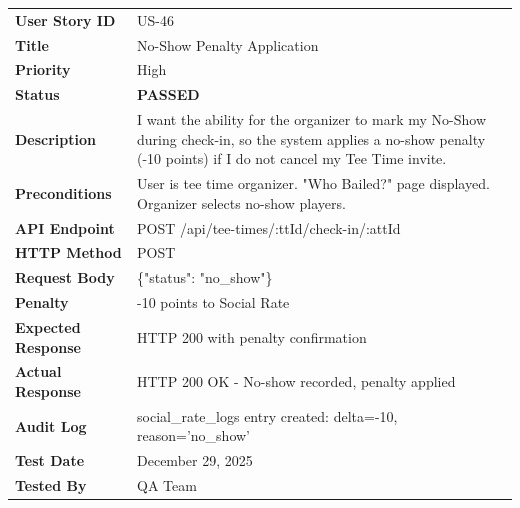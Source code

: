 \documentclass[11pt,a4paper]{article}
\newcommand{\passed}{\textcolor{pass}{\textbf{PASSED}}}
\begin{document}
\begin{tabularx}{\textwidth}{|p{3.2cm}|Y|}
\hline
{}
 \\
\hline
\textbf{User Story ID} & US-46 \\
\hline
\textbf{Title} & No-Show Penalty Application \\
\hline
\textbf{Priority} & High \\
\hline
\textbf{Status} & \passed \\
\hline
\textbf{Description} & I want the ability for the organizer to mark my No-Show during check-in, so the system applies a no-show penalty (-10 points) if I do not cancel my Tee Time invite. \\
\hline
\textbf{Preconditions} & User is tee time organizer. "Who Bailed?" page displayed. Organizer selects no-show players. \\
\hline
\textbf{API Endpoint} & POST /api/tee-times/:ttId/check-in/:attId \\
\hline
\textbf{HTTP Method} & POST \\
\hline
\textbf{Request Body} & \{"status": "no\_show"\} \\
\hline
\textbf{Penalty} & -10 points to Social Rate \\
\hline
\textbf{Expected Response} & HTTP 200 with penalty confirmation \\
\hline
\textbf{Actual Response} & HTTP 200 OK - No-show recorded, penalty applied \\
\hline
\textbf{Audit Log} & social\_rate\_logs entry created: delta=-10, reason='no\_show' \\
\hline
\textbf{Test Date} & December 29, 2025 \\
\hline
\textbf{Tested By} & QA Team \\
\hline
\end{tabularx}
\end{document}
